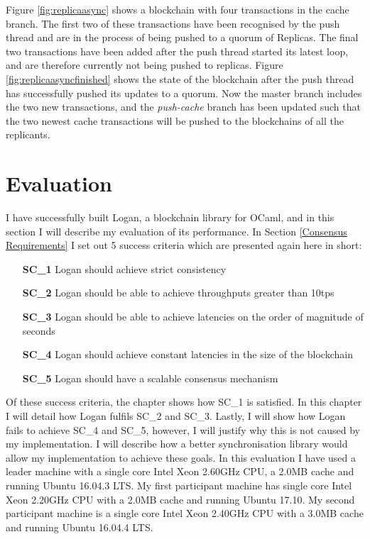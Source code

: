 \documentclass[12pt,a4paper,twoside,openright]{report}
\begin{document}
	Figure \ref{fig:replicaasync} shows a blockchain with four transactions in the cache branch.
	The first two of these transactions have been recognised by the push thread and are in the process of being pushed to a quorum of Replicas. 
	The final two transactions have been added after the push thread started its latest loop, and are therefore currently not being pushed to replicas.
	Figure \ref{fig:replicaasyncfinished} shows the state of the blockchain after the push thread has successfully pushed its updates to a quorum.
	Now the master branch includes the two new transactions, and the \textit{push-cache} branch has been updated such that the two newest cache transactions will be pushed to the blockchains of all the replicants.

	\chapter{Evaluation}
	I have successfully built Logan, a blockchain library for OCaml, and in this section I will describe my evaluation of its performance.
	In Section \ref{Consensus Requirements} I set out 5 success criteria which are presented again here in short:
	\begin{itemize}
		\setlength{\itemindent}{2em}
		\item[\textbf{SC\_1}] Logan should achieve strict consistency
		\item[\textbf{SC\_2}] Logan should be able to achieve throughputs greater than 10tps
		\item[\textbf{SC\_3}] Logan should be able to achieve latencies on the order of magnitude of seconds
		\item[\textbf{SC\_4}] Logan should achieve constant latencies in the size of the blockchain
		\item[\textbf{SC\_5}] Logan should have a scalable consensus mechanism 
	\end{itemize}
	Of these success criteria, the  chapter shows how SC\_1 is satisfied.
	In this chapter I will detail how Logan fulfils SC\_2 and SC\_3.
	Lastly, I will show how Logan fails to achieve SC\_4 and SC\_5, however, I will justify why this is not caused by my implementation.
	I will describe how a better synchronisation library would allow my implementation to achieve these goals.
	In this evaluation I have used a leader machine with a single core Intel Xeon 2.60GHz CPU, a 2.0MB cache and running Ubuntu 16.04.3 LTS. 
	My first participant machine has single core Intel Xeon 2.20GHz CPU with a 2.0MB cache and running Ubuntu 17.10.
	My second participant machine is a single core Intel Xeon 2.40GHz CPU with a 3.0MB cache and running Ubuntu 16.04.4 LTS.
\end{document}
